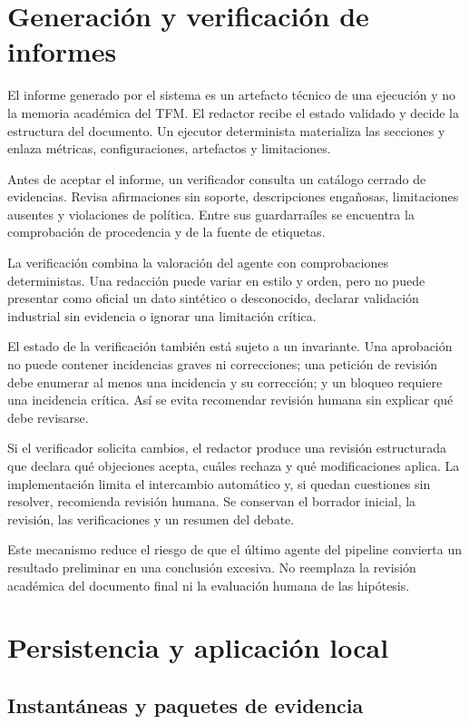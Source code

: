 \section{Generación y verificación de informes}

El informe generado por el sistema es un artefacto técnico de una ejecución y
no la memoria académica del TFM\@. El redactor recibe el estado validado y decide
la estructura del documento. Un ejecutor determinista materializa las secciones
y enlaza métricas, configuraciones, artefactos y limitaciones.

Antes de aceptar el informe, un verificador consulta un catálogo cerrado de
evidencias. Revisa afirmaciones sin soporte, descripciones engañosas,
limitaciones ausentes y violaciones de política. Entre sus guardarraíles se
encuentra la comprobación de procedencia y de la fuente de etiquetas.

La verificación combina la valoración del agente con comprobaciones
deterministas. Una redacción puede variar en estilo y orden, pero no puede
presentar como oficial un dato sintético o desconocido, declarar validación
industrial sin evidencia o ignorar una limitación crítica.

El estado de la verificación también está sujeto a un invariante. Una
aprobación no puede contener incidencias graves ni correcciones; una petición de
revisión debe enumerar al menos una incidencia y su corrección; y un bloqueo
requiere una incidencia crítica. Así se evita recomendar revisión humana sin
explicar qué debe revisarse.

Si el verificador solicita cambios, el redactor produce una revisión
estructurada que declara qué objeciones acepta, cuáles rechaza y qué
modificaciones aplica. La implementación limita el intercambio automático y,
si quedan cuestiones sin resolver, recomienda revisión humana. Se conservan el
borrador inicial, la revisión, las verificaciones y un resumen del debate.

Este mecanismo reduce el riesgo de que el último agente del pipeline convierta
un resultado preliminar en una conclusión excesiva. No reemplaza la revisión
académica del documento final ni la evaluación humana de las hipótesis.

\section{Persistencia y aplicación local}

\subsection{Instantáneas y paquetes de evidencia}

